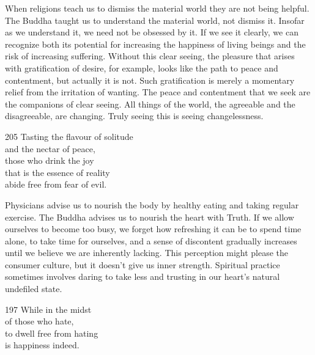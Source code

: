 \begin{dhpRefl}
  When religions teach us to dismiss the material world they are not being
  helpful. The Buddha taught us to understand the material world, not dismiss
  it. Insofar as we understand it, we need not be obsessed by it. If we see it
  clearly, we can recognize both its potential for increasing the happiness of
  living beings and the risk of increasing suffering. Without this clear seeing,
  the pleasure that arises with gratification of desire, for example, looks like
  the path to peace and contentment, but actually it is not. Such gratification
  is merely a momentary relief from the irritation of wanting. The peace and
  contentment that we seek are the companions of clear seeing. All things of the
  world, the agreeable and the disagreeable, are changing. Truly seeing this is
  seeing changelessness.
\end{dhpRefl}


\begin{dhpVerse}{205}
\label{dhp-205}
Tasting the flavour of solitude\\
and the nectar of peace,\\
those who drink the joy\\
that is the essence of reality\\
abide free from fear of evil.
\end{dhpVerse}

\begin{dhpRefl}
  Physicians advise us to nourish the body by healthy eating and taking regular
  exercise. The Buddha advises us to nourish the heart with Truth. If we allow
  ourselves to become too busy, we forget how refreshing it can be to spend time
  alone, to take time for ourselves, and a sense of discontent gradually
  increases until we believe we are inherently lacking. This perception might
  please the consumer culture, but it doesn’t give us inner strength. Spiritual
  practice sometimes involves daring to take less and trusting in our heart’s
  natural undefiled state.
\end{dhpRefl}


\begin{dhpVerse}{197}
\label{dhp-197}
While in the midst\\
of those who hate,\\
to dwell free from hating\\
is happiness indeed.
\end{dhpVerse}

